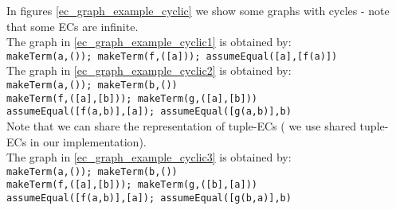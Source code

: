 \noindent
In figures \ref{ec_graph_example_cyclic} we show some graphs with cycles - note that some ECs are infinite.\\
The graph in \ref{ec_graph_example_cyclic1} is obtained by:\\
\lstinline|makeTerm(a,()); makeTerm(f,([a])); assumeEqual([a],[f(a)])|\\
The graph in \ref{ec_graph_example_cyclic2} is obtained by:\\
\lstinline|makeTerm(a,()); makeTerm(b,())|\\
\lstinline|makeTerm(f,([a],[b])); makeTerm(g,([a],[b]))|\\
\lstinline|assumeEqual([f(a,b)],[a]); assumeEqual([g(a,b)],b)|\\
Note that we can share the representation of tuple-ECs ( we use shared tuple-ECs in our implementation).\\
The graph in \ref{ec_graph_example_cyclic3} is obtained by:\\
\lstinline|makeTerm(a,()); makeTerm(b,())|\\
\lstinline|makeTerm(f,([a],[b])); makeTerm(g,([b],[a]))|\\
\lstinline|assumeEqual([f(a,b)],[a]); assumeEqual([g(b,a)],b)|

